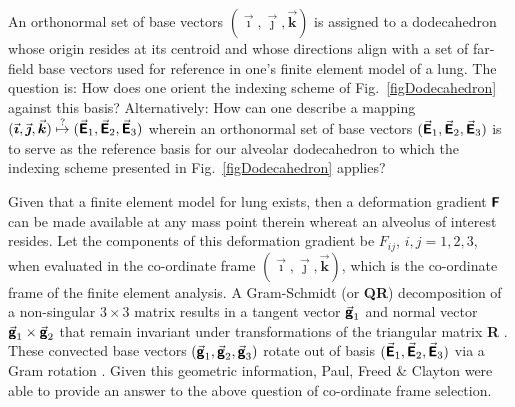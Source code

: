 An orthonormal set of base vectors $( \vec{\boldsymbol{\imath}} , \vec{\boldsymbol{\jmath}} , \vec{\boldsymbol{k}} )$ is assigned to a dodecahedron whose origin resides at its centroid and whose directions align with a set of far-field base vectors used for reference in one's finite element model of a lung.  The question is: How does one orient the indexing scheme of Fig.~\ref{figDodecahedron} against this basis?  Alternatively:  How can one describe a mapping $( \vec{\boldsymbol{\imath}} , \vec{\boldsymbol{\jmath}} , \vec{\boldsymbol{k}} ) \overset{\text{?}}{\mapsto} ( \vec{\boldsymbol{\mathsf{E}}}_1 , \vec{\boldsymbol{\mathsf{E}}}_2 , \vec{\boldsymbol{\mathsf{E}}}_3 )$ wherein an ortho\-normal set of base vectors $( \vec{\boldsymbol{\mathsf{E}}}_1 , \vec{\boldsymbol{\mathsf{E}}}_2 , \vec{\boldsymbol{\mathsf{E}}}_3 )$ is to serve as the reference basis for our alveolar dodecahedron to which the indexing scheme presented in Fig.~\ref{figDodecahedron} applies?

Given that a finite element model for lung exists, then a deformation gradient $\boldsymbol{\mathsf{F}}$ can be made available at any mass point therein whereat an alveolus of interest resides.  Let the components of this deformation gradient be $F_{ij}$, $i, j = 1,2,3$, when evaluated in the co-ordinate frame $( \vec{\boldsymbol{\imath}} , \vec{\boldsymbol{\jmath}} , \vec{\boldsymbol{k}} )$, which is the co-ordinate frame of the finite element analysis.  A Gram-Schmidt (or \textbf{QR}) decomposition of a non-singular $3 \! \times \! 3$ matrix results in a tangent vector $\vec{\boldsymbol{\mathsf{g}}}_1$ and normal vector $\vec{\boldsymbol{\mathsf{g}}}_1 \times \vec{\boldsymbol{\mathsf{g}}}_2$ that remain invariant under transformations of the triangular matrix \textbf{R} \cite{McLellan80}.  These convected base vectors $( \vec{\boldsymbol{\mathsf{g}}}_1 , \vec{\boldsymbol{\mathsf{g}}}_2 , \vec{\boldsymbol{\mathsf{g}}}_3 )$ rotate out of basis $( \vec{\boldsymbol{\mathsf{E}}}_1 , \vec{\boldsymbol{\mathsf{E}}}_2 , \vec{\boldsymbol{\mathsf{E}}}_3 )$ via a Gram rotation \cite{FreedZamani18}.  Given this geometric information, Paul, Freed \& Clayton \cite{Pauletal20} were able to provide an answer to the above question of co-ordinate frame selection.

